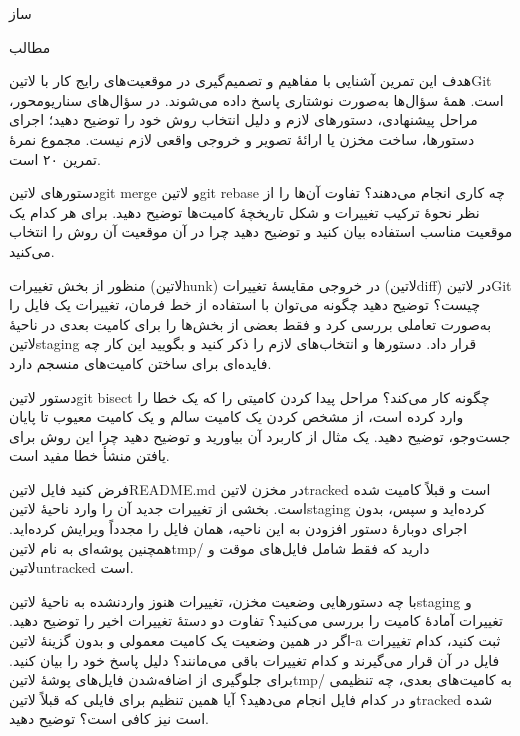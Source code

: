 \documentclass{../assignment}
\begin{document}
‌ساز

‌مطالب


هدف این تمرین آشنایی با مفاهیم و تصمیم‌گیری در موقعیت‌های رایج کار با
‌لاتین{Git} است.
همهٔ سؤال‌ها به‌صورت نوشتاری پاسخ داده می‌شوند. در سؤال‌های سناریومحور،
مراحل پیشنهادی، دستورهای لازم و دلیل انتخاب روش خود را توضیح دهید؛
اجرای دستورها، ساخت مخزن یا ارائهٔ تصویر و خروجی واقعی لازم نیست.
مجموع نمرهٔ تمرین ۲۰ است.



دستورهای ‌لاتین{git merge} و ‌لاتین{git rebase} چه کاری انجام می‌دهند؟
تفاوت آن‌ها را از نظر نحوهٔ ترکیب تغییرات و شکل تاریخچهٔ کامیت‌ها توضیح دهید.
برای هر کدام یک موقعیت مناسب استفاده بیان کنید و توضیح دهید چرا در آن موقعیت
آن روش را انتخاب می‌کنید.


منظور از بخش تغییرات (‌لاتین{hunk}) در خروجی مقایسهٔ تغییرات
(‌لاتین{diff}) در ‌لاتین{Git} چیست؟
توضیح دهید چگونه می‌توان با استفاده از خط فرمان، تغییرات یک فایل را به‌صورت
تعاملی بررسی کرد و فقط بعضی از بخش‌ها را برای کامیت بعدی در ناحیهٔ
‌لاتین{staging} قرار داد. دستورها و انتخاب‌های لازم را ذکر کنید و بگویید
این کار چه فایده‌ای برای ساختن کامیت‌های منسجم دارد.


دستور ‌لاتین{git bisect} چگونه کار می‌کند؟ مراحل پیدا کردن کامیتی را که
یک خطا را وارد کرده است، از مشخص کردن یک کامیت سالم و یک کامیت معیوب تا پایان
جست‌وجو، توضیح دهید. یک مثال از کاربرد آن بیاورید و توضیح دهید چرا این روش
برای یافتن منشأ خطا مفید است.


فرض کنید فایل ‌لاتین{README.md} در مخزن ‌لاتین{tracked} است و قبلاً
کامیت شده است. بخشی از تغییرات جدید
آن را وارد ناحیهٔ ‌لاتین{staging} کرده‌اید و سپس، بدون اجرای دوبارهٔ
دستور افزودن به این ناحیه، همان فایل را مجدداً ویرایش کرده‌اید.
همچنین پوشه‌ای به نام ‌لاتین{tmp/} دارید که فقط شامل فایل‌های موقت و
‌لاتین{untracked} است.

 با چه دستورهایی وضعیت مخزن، تغییرات هنوز واردنشده به ناحیهٔ
‌لاتین{staging} و تغییرات آمادهٔ کامیت را بررسی می‌کنید؟
تفاوت دو دستهٔ تغییرات اخیر را توضیح دهید.
 اگر در همین وضعیت یک کامیت معمولی و بدون گزینهٔ
‌لاتین{-a} ثبت کنید، کدام تغییرات فایل در آن قرار می‌گیرند و کدام
تغییرات باقی می‌مانند؟ دلیل پاسخ خود را بیان کنید.
 برای جلوگیری از اضافه‌شدن فایل‌های پوشهٔ ‌لاتین{tmp/} به کامیت‌های
بعدی، چه تنظیمی و در کدام فایل انجام می‌دهید؟ آیا همین تنظیم برای فایلی که
قبلاً ‌لاتین{tracked} شده است نیز کافی است؟ توضیح دهید.
\end{document}
